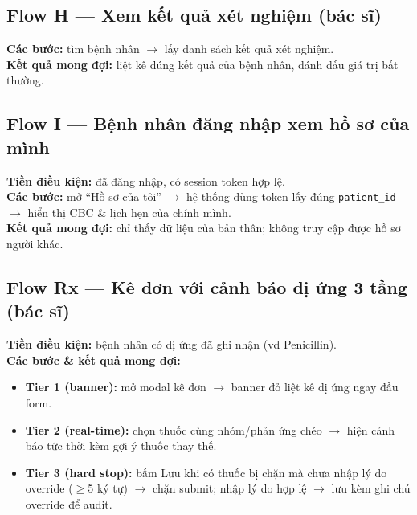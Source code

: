 \documentclass[a4paper,12pt]{article}
\begin{document}
\subsection{Flow H --- Xem kết quả xét nghiệm (bác sĩ)}
\textbf{Các bước:} tìm bệnh nhân $\to$ lấy danh sách kết quả xét nghiệm.\\
\textbf{Kết quả mong đợi:} liệt kê đúng kết quả của bệnh nhân, đánh dấu giá trị bất thường.

\subsection{Flow I --- Bệnh nhân đăng nhập xem hồ sơ của mình}
\textbf{Tiền điều kiện:} đã đăng nhập, có session token hợp lệ.\\
\textbf{Các bước:} mở ``Hồ sơ của tôi'' $\to$ hệ thống dùng token lấy đúng \texttt{patient\_id} $\to$ hiển thị CBC \& lịch hẹn của chính mình.\\
\textbf{Kết quả mong đợi:} chỉ thấy dữ liệu của bản thân; không truy cập được hồ sơ người khác.

\subsection{Flow Rx --- Kê đơn với cảnh báo dị ứng 3 tầng (bác sĩ)}
\textbf{Tiền điều kiện:} bệnh nhân có dị ứng đã ghi nhận (vd Penicillin).\\
\textbf{Các bước \& kết quả mong đợi:}
\begin{itemize}[leftmargin=1.4em]
  \item \textbf{Tier 1 (banner):} mở modal kê đơn $\to$ banner đỏ liệt kê dị ứng ngay đầu form.
  \item \textbf{Tier 2 (real-time):} chọn thuốc cùng nhóm/phản ứng chéo $\to$ hiện cảnh báo tức thời kèm gợi ý thuốc thay thế.
  \item \textbf{Tier 3 (hard stop):} bấm Lưu khi có thuốc bị chặn mà chưa nhập lý do override ($\geq$5 ký tự) $\to$ chặn submit; nhập lý do hợp lệ $\to$ lưu kèm ghi chú override để audit.
\end{itemize}
\end{document}
